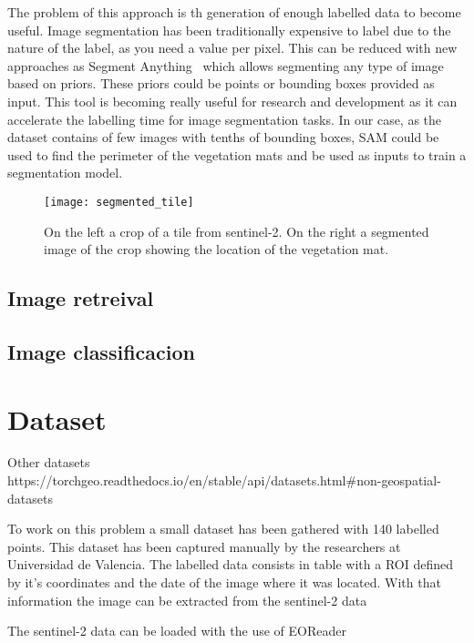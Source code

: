 \documentclass[conference]{IEEEtran}
\begin{document}
    The problem of this approach is th generation of enough labelled data to become useful.
    Image segmentation has been traditionally expensive to label due to the nature of the label, as
    you need a value per pixel.
    This can be reduced with new approaches as Segment Anything~\cite{kirillov2023segment} which allows segmenting any type of image based on priors.
    These priors could be points or bounding boxes provided as input.
    This tool is becoming really useful for research and development as it can accelerate the labelling time for image segmentation tasks.
    In our case, as the dataset contains of few images with tenths of bounding boxes, SAM could be used to find the perimeter
    of the vegetation mats and be used as inputs to train a segmentation model.

    \begin{figure}[h]
        \centering
        \texttt{[image: segmented\_tile]}
        \caption{On the left a crop of a tile from sentinel-2. On the right a segmented image of the crop showing the
        location of the vegetation mat.}
        \label{fig:tile-segmented}
    \end{figure}

    \subsection{Image retreival}

    \subsection{Image classificacion}


    \section{Dataset}\label{sec:dataset}
    Other datasets
    https://torchgeo.readthedocs.io/en/stable/api/datasets.html#non-geospatial-datasets

    To work on this problem a small dataset has been gathered with 140 labelled points.
    This dataset has been captured manually by the researchers at Universidad de Valencia.
    The labelled data consists in table with a ROI defined by it's coordinates and the date
    of the image where it was located.
    With that information the image can be extracted from the sentinel-2 data

    The sentinel-2 data can be loaded with the use of EOReader~\cite{eoreader_paper}
\end{document}
